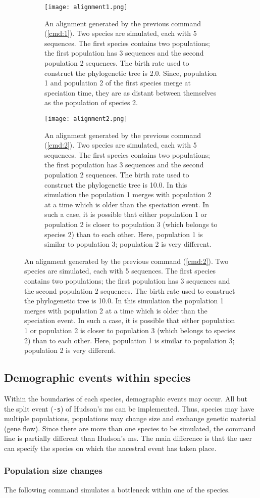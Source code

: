 \begin{figure}[htbp!]

  \begin{subfigure}{\textwidth}
    \texttt{[image: alignment1.png]}
    \caption{An alignment generated by the previous command (\ref{cmd:1}). Two species are simulated, each with 5 sequences. The first species contains two populations; the first population has 3 sequences and the second population 2 sequences. The birth rate used to construct the phylogenetic tree is 2.0. Since, population 1 and population 2 of the first species merge at speciation time, they are as distant between themselves as the population of species 2. }
    \label{fig:4}
  \end{subfigure}
  
  
  \begin{subfigure}{\textwidth}
    \texttt{[image: alignment2.png]}
    \caption{An alignment generated by the previous command (\ref{cmd:2}). Two species are simulated, each with 5 sequences. The first species contains two populations; the first population has 3 sequences and the second population 2 sequences. The birth rate used to construct the phylogenetic tree is 10.0. In this simulation the population 1 merges with population 2 at a time which is older than the speciation event. In such a case, it is possible that either population 1 or population 2 is closer to population 3 (which belongs to species 2) than to each other. Here, population 1 is similar to population 3; population 2 is very different. }
    \label{fig:5}
  \end{subfigure}
\end{figure}




\subsection{Demographic events within species}
Within the boundaries of each species, demographic events may occur. All but the split event (\verb!-s!) of Hudson's ms can be implemented. Thus, species may have multiple populations, populations may change size and exchange genetic material (gene flow). Since there are more than one species to be simulated, the command line is partially different than Hudson's ms. The main difference is that the user can specify the species on which the ancestral event has taken place. 

\subsubsection{Population size changes}
The following command simulates a bottleneck within one of the species.

